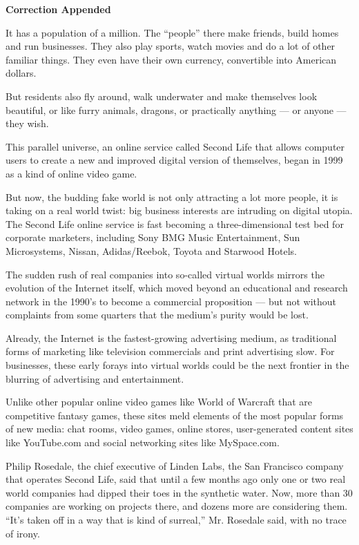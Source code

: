 \textbf{Correction Appended}

It has a population of a million. The ``people'' there make friends,
build homes and run businesses. They also play sports, watch movies and
do a lot of other familiar things. They even have their own currency,
convertible into American dollars.

But residents also fly around, walk underwater and make themselves look
beautiful, or like furry animals, dragons, or practically anything ---
or anyone --- they wish.

This parallel universe, an online service called Second Life that allows
computer users to create a new and improved digital version of
themselves, began in 1999 as a kind of online video game.

But now, the budding fake world is not only attracting a lot more
people, it is taking on a real world twist: big business interests are
intruding on digital utopia. The Second Life online service is fast
becoming a three-dimensional test bed for corporate marketers, including
Sony BMG Music Entertainment, Sun Microsystems, Nissan, Adidas/Reebok,
Toyota and Starwood Hotels.

The sudden rush of real companies into so-called virtual worlds mirrors
the evolution of the Internet itself, which moved beyond an educational
and research network in the 1990's to become a commercial proposition
--- but not without complaints from some quarters that the medium's
purity would be lost.

Already, the Internet is the fastest-growing advertising medium, as
traditional forms of marketing like television commercials and print
advertising slow. For businesses, these early forays into virtual worlds
could be the next frontier in the blurring of advertising and
entertainment.

Unlike other popular online video games like World of Warcraft that are
competitive fantasy games, these sites meld elements of the most popular
forms of new media: chat rooms, video games, online stores,
user-generated content sites like YouTube.com and social networking
sites like MySpace.com.

Philip Rosedale, the chief executive of Linden Labs, the San Francisco
company that operates Second Life, said that until a few months ago only
one or two real world companies had dipped their toes in the synthetic
water. Now, more than 30 companies are working on projects there, and
dozens more are considering them. ``It's taken off in a way that is kind
of surreal,'' Mr. Rosedale said, with no trace of irony.

